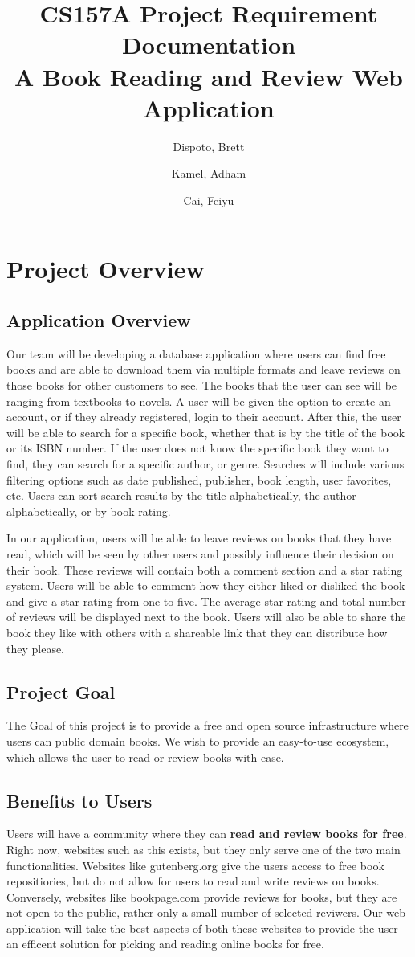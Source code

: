 \documentclass[letter, 12pt, titlepage]{article}
\author{ Dispoto, Brett\\
        \and
        Kamel, Adham\\
        \and
        Cai, Feiyu\\
}
\title{CS157A Project Requirement Documentation \\
        \large A Book Reading and Review Web Application}
\begin{document}
  \maketitle
        \section{Project Overview}
        \subsection{Application Overview}
        Our team will be developing a database application where users can find free books and are able to download them via multiple formats and leave reviews on those books for other customers to see. The books that the user can see will be ranging from textbooks to novels. A user will be given the option to create an account, or if they already registered, login to their account. After this, the user will be able to search for a specific book, whether that is by the title of the book or its ISBN number. If the user does not know the specific book they want to find, they can search for a specific author, or genre. Searches will include various filtering options such as date published, publisher, book length, user favorites, etc. Users can sort search results by the title alphabetically, the author alphabetically, or by book rating.

\medskip
        In our application, users will be able to leave reviews on books that they have read, which will be seen by other users and possibly influence their decision on their book. These reviews will contain both a comment section and a star rating system. Users will be able to comment how they either liked or disliked the book and give a star rating from one to five. The average star rating and total number of reviews will be displayed next to the book. Users will also be able to share the book they like with others with a shareable link that they can distribute how they please.

	\subsection{Project Goal}
	The Goal of this project is to provide a free and open source infrastructure where users can public domain books. We wish to provide an easy-to-use ecosystem, which allows the user to read or review books with ease.
	\subsection{Benefits to Users}
	Users will have a community where they can \textbf{read and review books for free}. Right now, websites such as this exists, but they only serve one of the two main functionalities. Websites like gutenberg.org give the users access to free book repositiories, but do not allow for users to read and write reviews on books. Conversely, websites like bookpage.com provide reviews for books, but they are not open to the public, rather only a small number of selected reviwers. Our web application will take the best aspects of both these websites to provide the user an efficent solution for picking and reading online books for free.
\end{document}
